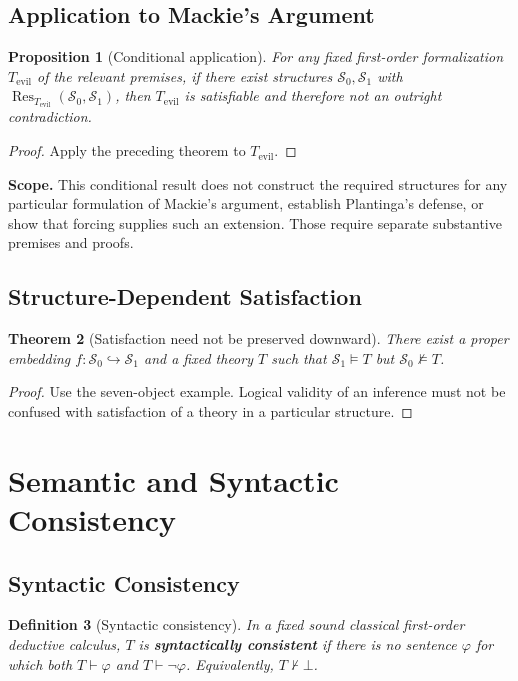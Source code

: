 \documentclass[11pt]{article}
\newtheorem{definition}{Definition}
\newtheorem{theorem}[definition]{Theorem}
\newtheorem{proposition}[definition]{Proposition}
\newcommand{\Sat}{\models}
\newcommand{\NSat}{\not\models}
\newcommand{\Res}{\operatorname{Res}}
\newcommand{\Emb}{\hookrightarrow}
\begin{document}
\subsection{Application to Mackie's Argument}
\begin{proposition}[Conditional application]
For any fixed first-order formalization $T_{\mathrm{evil}}$ of the relevant premises, if there exist structures $\mathcal S_0,\mathcal S_1$ with $\Res_{T_{\mathrm{evil}}}(\mathcal S_0,\mathcal S_1)$, then $T_{\mathrm{evil}}$ is satisfiable and therefore not an outright contradiction.
\end{proposition}
\begin{proof}
Apply the preceding theorem to $T_{\mathrm{evil}}$.
\end{proof}
\noindent\textbf{Scope.} This conditional result does not construct the required structures for any particular formulation of Mackie's argument, establish Plantinga's defense, or show that forcing supplies such an extension. Those require separate substantive premises and proofs.
\subsection{Structure-Dependent Satisfaction}
\begin{theorem}[Satisfaction need not be preserved downward]
There exist a proper embedding $f:\mathcal S_0\Emb\mathcal S_1$ and a fixed theory $T$ such that $\mathcal S_1\Sat T$ but $\mathcal S_0\NSat T$.
\end{theorem}
\begin{proof}
Use the seven-object example. Logical validity of an inference must not be confused with satisfaction of a theory in a particular structure.
\end{proof}

\section{Semantic and Syntactic Consistency}
\subsection{Syntactic Consistency}
\begin{definition}[Syntactic consistency]
In a fixed sound classical first-order deductive calculus, $T$ is \textbf{syntactically consistent} if there is no sentence $\varphi$ for which both $T\vdash\varphi$ and $T\vdash\neg\varphi$. Equivalently, $T\nvdash\bot$.
\end{definition}
\end{document}
